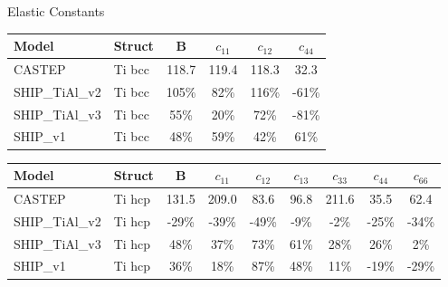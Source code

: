\documentclass[preview]{standalone}
\begin{document}
\begin{center}
\textnormal{Elastic Constants} \\
\vspace{2mm}
\begin{tabular}{ l l c c c c } \toprule 
Model & Struct & B & $c_{11}$ & $c_{12}$ & $c_{44}$\\ \midrule 
CASTEP & Ti bcc & 118.7 & 119.4 & 118.3 & 32.3\\ 
SHIP\_TiAl\_v2 & Ti bcc & 105\% & 82\% & 116\% & -61\%\\ 
SHIP\_TiAl\_v3 & Ti bcc & 55\% & 20\% & 72\% & -81\%\\ 
SHIP\_v1 & Ti bcc & 48\% & 59\% & 42\% & 61\%\\ 
\end{tabular} \bigskip \begin{tabular}{ l l c c c c c c c } \toprule 
Model & Struct & B & $c_{11}$ & $c_{12}$ & $c_{13}$ & $c_{33}$ & $c_{44}$ & $c_{66}$\\ \midrule 
CASTEP & Ti hcp & 131.5 & 209.0 & 83.6 & 96.8 & 211.6 & 35.5 & 62.4\\ 
SHIP\_TiAl\_v2 & Ti hcp & -29\% & -39\% & -49\% & -9\% & -2\% & -25\% & -34\%\\ 
SHIP\_TiAl\_v3 & Ti hcp & 48\% & 37\% & 73\% & 61\% & 28\% & 26\% & 2\%\\ 
SHIP\_v1 & Ti hcp & 36\% & 18\% & 87\% & 48\% & 11\% & -19\% & -29\%\\ 
\end{tabular} \bigskip 
\end{center}
\end{document}
